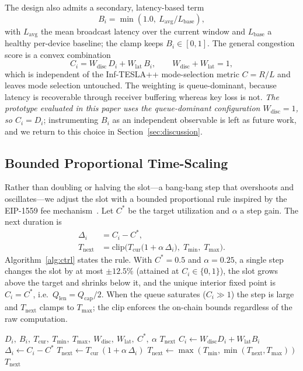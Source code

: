 \documentclass[conference]{IEEEtran}
\begin{document}
The design also admits a secondary, latency-based term
\begin{equation}
B_i = \min\!\left(1.0,\ L_{\mathrm{avg}}/L_{\mathrm{base}}\right),
\label{eq:bi}
\end{equation}
with $L_{\mathrm{avg}}$ the mean broadcast latency over the current window and
$L_{\mathrm{base}}$ a healthy per-device baseline; the clamp keeps
$B_i\in[0,1]$. The general congestion score is a convex combination
\begin{equation}
C_i = W_{\mathrm{disc}}\,D_i + W_{\mathrm{lat}}\,B_i,\qquad
W_{\mathrm{disc}}+W_{\mathrm{lat}}=1,
\label{eq:score}
\end{equation}
which is independent of the Inf-TESLA++ mode-selection metric $C=R/L$ and leaves
mode selection untouched. The weighting is queue-dominant, because latency is
recoverable through receiver buffering whereas key loss is not. \emph{The
prototype evaluated in this paper uses the queue-dominant configuration
$W_{\mathrm{disc}}=1$, so $C_i=D_i$}; instrumenting $B_i$ as an independent
observable is left as future work, and we return to this choice in
Section~\ref{sec:discussion}.

\subsection{Bounded Proportional Time-Scaling}
Rather than doubling or halving the slot---a bang-bang step that overshoots and
oscillates---we adjust the slot with a bounded proportional rule inspired by the
EIP-1559 fee mechanism~\cite{eip1559}. Let $C^{\ast}$ be the target utilization
and $\alpha$ a step gain. The next duration is
\begin{align}
\Delta_i &= C_i - C^{\ast}, \label{eq:delta}\\
T_{\mathrm{next}} &= \mathrm{clip}\!\Big(T_{\mathrm{cur}}\big(1+\alpha\,\Delta_i\big),\;
T_{\min},\;T_{\max}\Big).
\label{eq:update}
\end{align}
Algorithm~\ref{alg:ctrl} states the rule. With $C^{\ast}=0.5$ and $\alpha=0.25$, a
single step changes the slot by at most $\pm 12.5\%$ (attained at
$C_i\in\{0,1\}$), the slot grows above the target and shrinks below it, and the
unique interior fixed point is $C_i=C^{\ast}$, i.e.\ $Q_{\mathrm{len}}=
Q_{\mathrm{cap}}/2$. When the queue saturates ($C_i\gg 1$) the step is large and
$T_{\mathrm{next}}$ clamps to $T_{\max}$; the clip enforces the on-chain bounds
regardless of the raw computation.

\begin{algorithm}[t]
\caption{Bounded Proportional Time-Scaling (per slot boundary)}
\label{alg:ctrl}
\begin{algorithmic}[1]
\REQUIRE $D_i,\ B_i,\ T_{\mathrm{cur}},\ T_{\min},\ T_{\max},\
W_{\mathrm{disc}},\ W_{\mathrm{lat}},\ C^{\ast},\ \alpha$
\ENSURE $T_{\mathrm{next}}$
\STATE $C_i \gets W_{\mathrm{disc}}D_i + W_{\mathrm{lat}}B_i$
\STATE $\Delta_i \gets C_i - C^{\ast}$
\STATE $T_{\mathrm{next}} \gets T_{\mathrm{cur}}\,(1 + \alpha\,\Delta_i)$
\STATE $T_{\mathrm{next}} \gets \max(T_{\min},\min(T_{\mathrm{next}},T_{\max}))$
\RETURN $T_{\mathrm{next}}$
\end{algorithmic}
\end{algorithm}
\end{document}
